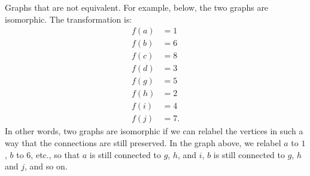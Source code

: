 \documentclass[11pt]{scrartcl}
\begin{document}
\begin{definition*}
Graphs that are not equivalent. For example, below, the two graphs are isomorphic. The transformation is: 
\begin{align*}
f(a) &= 1 \\
f(b) &= 6 \\
f(c) &= 8 \\
f(d) &= 3 \\
f(g) &= 5 \\
f(h) &= 2 \\
f(i) &= 4 \\
f(j) &= 7.
\end{align*}
In other words, two graphs are isomorphic if we can relabel the vertices in such a way that the connections are still preserved. In the graph above, we relabel $a$ to $1$, $b$ to $6$, etc., so that $a$ is still connected to $g$, $h$, and $i$, $b$ is still connected to $g$, $h$ and $j$, and so on.
\end{definition*}
\end{document}
